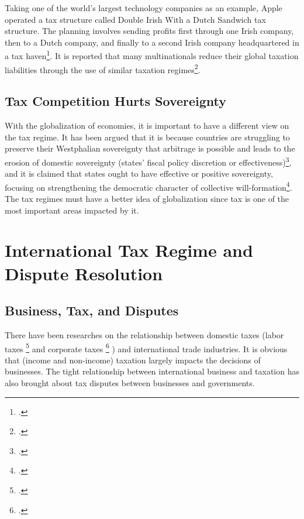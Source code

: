 Taking one of the world's largest technology companies as an example, Apple operated a tax structure called Double Irish With a Dutch Sandwich tax structure. The planning involves sending profits first through one Irish company, then to a Dutch company, and finally to a second Irish company headquartered in a tax haven\footcite{Snowden2017}.
It is reported that many multinationals reduce their global taxation liabilities through the use of similar taxation regimes\footcite{2022}.


\subsection{Tax Competition Hurts Sovereignty}

With the globalization of economies, it is important to have a different view on the tax regime. It has been argued that it is because countries are struggling to preserve their Westphalian sovereignty that arbitrage is possible and leads to the erosion of domestic sovereignty (states' fiscal policy discretion or effectiveness)\footcite[2110]{Dietsch2011}, and it is claimed that states ought to have effective or positive sovereignty, focusing on strengthening the democratic character of collective will-formation\footcite[225]{Dietsch2016}. The tax regimes must have a better idea of globalization since tax is one of the most important areas impacted by it. 







\section{International Tax Regime and Dispute Resolution}

\subsection{Business, Tax, and Disputes}

There have been researches on the relationship between domestic taxes (labor taxes \footcite{Adarov2021}  and corporate taxes \footcite{Holzner2021} ) and international trade industries. It is obvious that (income and non-income) taxation largely impacts the decisions of businesses. The tight relationship between international business and taxation has also brought about tax disputes between businesses and governments.



